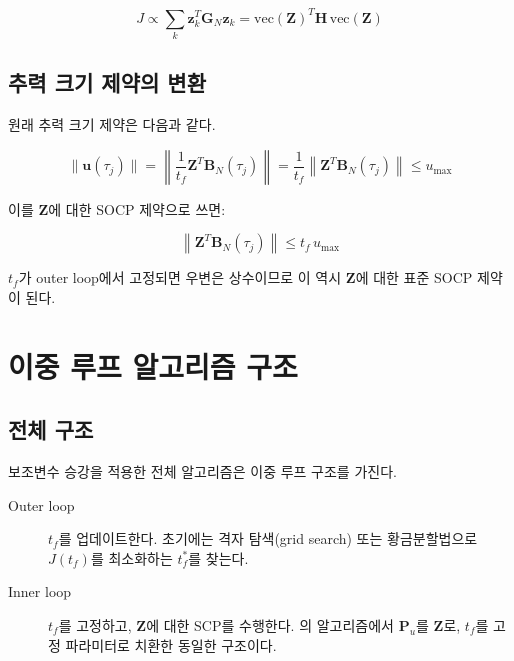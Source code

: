 \documentclass[11pt]{article}
\begin{document}
\begin{equation}
  J \propto \sum_k \mathbf{z}_k^T \mathbf{G}_N \mathbf{z}_k
  = \mathrm{vec}(\mathbf{Z})^T \mathbf{H}\, \mathrm{vec}(\mathbf{Z})
  \label{eq:cost_lifted_qp}
\end{equation}

\subsection{추력 크기 제약의 변환}

원래 추력 크기 제약은 다음과 같다.

\begin{equation}
  \|\mathbf{u}(\tau_j)\|
  = \left\|\frac{1}{t_f}\mathbf{Z}^T\mathbf{B}_N(\tau_j)\right\|
  = \frac{1}{t_f}\left\|\mathbf{Z}^T\mathbf{B}_N(\tau_j)\right\|
  \leq u_{\max}
\end{equation}

이를 $\mathbf{Z}$에 대한 SOCP 제약으로 쓰면:

\begin{equation}
  \left\|\mathbf{Z}^T\mathbf{B}_N(\tau_j)\right\| \leq t_f\, u_{\max}
  \label{eq:thrust_lifted}
\end{equation}

$t_f$가 outer loop에서 고정되면 우변은 상수이므로
이 역시 $\mathbf{Z}$에 대한 표준 SOCP 제약이 된다.

\section{이중 루프 알고리즘 구조}

\subsection{전체 구조}

보조변수 승강을 적용한 전체 알고리즘은 이중 루프 구조를 가진다.

\begin{description}
  \item[Outer loop] $t_f$를 업데이트한다.
        초기에는 격자 탐색(grid search) 또는 황금분할법으로
        $J(t_f)$를 최소화하는 $t_f^*$를 찾는다.

  \item[Inner loop] $t_f$를 고정하고, $\mathbf{Z}$에 대한 SCP를 수행한다.
        \cite{report006}의 알고리즘에서 $\mathbf{P}_u$를 $\mathbf{Z}$로,
        $t_f$를 고정 파라미터로 치환한 동일한 구조이다.
\end{description}
\end{document}
